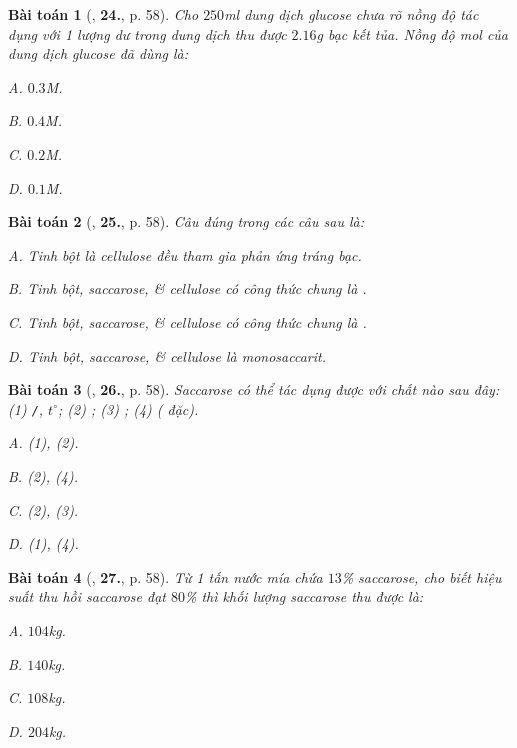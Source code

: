 \documentclass{article}
\numberwithin{equation}{section}
\newtheorem{baitoan}{Bài toán}[section]
\begin{document}
\begin{baitoan}[\cite{An2008}, \textbf{24.}, p. 58]
	Cho $250$\emph{ml} dung dịch glucose chưa rõ nồng độ tác dụng với 1 lượng dư \emph{} trong dung dịch \emph{} thu được $2.16$\emph{g} bạc kết tủa. Nồng độ mol của dung dịch glucose đã dùng là:
	\begin{enumerate*}
		\item[{\rm\sf A.}] $0.3$\emph{M}.
		\item[{\rm\sf B.}] $0.4$\emph{M}.
		\item[{\rm\sf C.}] $0.2$\emph{M}.
		\item[{\rm\sf D.}] $0.1$\emph{M}.
	\end{enumerate*}
\end{baitoan}

\begin{baitoan}[\cite{An2008}, \textbf{25.}, p. 58]
	Câu đúng trong các câu sau là:
	\begin{enumerate*}
		\item[{\rm\sf A.}] Tinh bột là cellulose đều tham gia phản ứng tráng bạc.
		\item[{\rm\sf B.}] Tinh bột, saccarose, \& cellulose có công thức chung là \emph{}.
		\item[{\rm\sf C.}] Tinh bột, saccarose, \& cellulose có công thức chung là \emph{}.
		\item[{\rm\sf D.}] Tinh bột, saccarose, \& cellulose là monosaccarit.
	\end{enumerate*}
\end{baitoan}

\begin{baitoan}[\cite{An2008}, \textbf{26.}, p. 58]
	Saccarose có thể tác dụng được với chất nào sau đây: (1) \emph{\texttt{/}}, $t^\circ$; (2) \emph{}; (3) \emph{}; (4) \emph{} (\emph{} đặc).
	\begin{enumerate*}
		\item[{\rm\sf A.}] (1), (2).
		\item[{\rm\sf B.}] (2), (4).
		\item[{\rm\sf C.}] (2), (3).
		\item[{\rm\sf D.}] (1), (4).
	\end{enumerate*}
\end{baitoan}

\begin{baitoan}[\cite{An2008}, \textbf{27.}, p. 58]
	Từ 1 tấn nước mía chứa $13$\% saccarose, cho biết hiệu suất thu hồi saccarose đạt $80$\% thì khối lượng saccarose thu được là:
	\begin{enumerate*}
		\item[{\rm\sf A.}] $104$\emph{kg}.
		\item[{\rm\sf B.}] $140$\emph{kg}.
		\item[{\rm\sf C.}] $108$\emph{kg}.
		\item[{\rm\sf D.}] $204$\emph{kg}.
	\end{enumerate*}
\end{baitoan}
\end{document}
